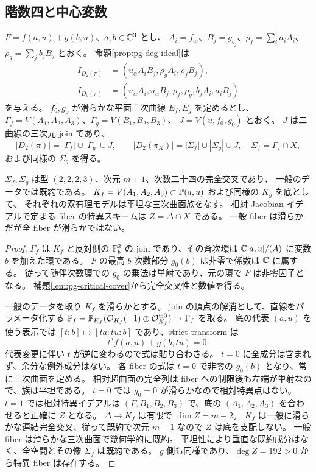 \subsection{階数四と中心変数}
$F=f(a,u)+g(b,u)$、$a,b\in\mathbb C^3$ とし、
$A_i=f_{a_i}$、$B_j=g_{b_j}$、$\rho_f=\sum_i a_iA_i$、$\rho_g=\sum_jb_jB_j$ とおく。
命題\ref{prop:pg-deg-ideal}は
\begin{equation}\begin{aligned}
I_{D_2(\pi)}&=(u_\alpha A_iB_j,\rho_gA_i,\rho_fB_j),\\
I_{D_0(\pi)}&=(u_\alpha A_i,u_\alpha B_j,\rho_f,\rho_g,b_jA_i,a_iB_j)
\end{aligned}\end{equation}
を与える。
$f_0,g_0$ が滑らかな平面三次曲線 $E_f,E_g$ を定めるとし、
$\Gamma_f=V(A_1,A_2,A_3)$、$\Gamma_g=V(B_1,B_2,B_3)$、
$J=V(u,f_0,g_0)$ とおく。
$J$ は二曲線の三次元 join であり、
\begin{equation}
|D_2(\pi)|=|\Gamma_f|\cup|\Gamma_g|\cup J,
\qquad |D_2(\pi_X)|=|\Sigma_f|\cup|\Sigma_g|\cup J,
\quad\Sigma_f=\Gamma_f\cap X,
\end{equation}
および同様の $\Sigma_g$ を得る。
\begin{proposition}\label{prop:pg-cubic-surface-family}
$\Sigma_f,\Sigma_g$ は型 $(2,2,2,3)$、次元 $m+1$、次数二十四の完全交叉であり、
一般のデータでは既約である。
$K_f=V(A_1,A_2,A_3)\subset\mathbb P(a,u)$ および同様の $K_g$ を底として、
それぞれの双有理モデルは平坦な三次曲面族をなす。
相対 Jacobian イデアルで定まる fiber の特異スキームは $Z=\Delta\cap X$ である。
一般 fiber は滑らかだが全 fiber が滑らかではない。
\end{proposition}
\begin{proof}
$\Gamma_f$ は $K_f$ と反対側の $\mathbb P_b^2$ の join であり、その斉次環は
$\mathbb C[a,u]/(A)$ に変数 $b$ を加えた環である。
$F$ の最高 $b$ 次数部分 $g_0(b)$ は非零で係数は $\mathbb C$ に属する。
従って随伴次数環での $g_0$ の乗法は単射であり、元の環で $F$ は非零因子となる。
補題\ref{lem:pg-critical-cover}から完全交叉性と数値を得る。

一般のデータを取り $K_f$ を滑らかとする。
join の頂点の解消として、直線をパラメータ化する
$\mathbb P_f=\mathbb P_{K_f}(\mathcal O_{K_f}(-1)\oplus\mathcal O_{K_f}^{\oplus3})\to\Gamma_f$ を取る。
底の代表 $(a,u)$ を使う表示では $[t:b]\mapsto[ta:tu:b]$ であり、strict transform は
\begin{equation}
t^3f(a,u)+g(b,tu)=0.\label{eq:pg-surface-fiber}
\end{equation}
代表変更に伴い $t$ が逆に変わるので式は貼り合わさる。
$t=0$ に全成分は含まれず、余分な例外成分はない。
各 fiber の式は $t=0$ で非零の $g_0(b)$ となり、常に三次曲面を定める。
相対超曲面の完全列は fiber への制限後も左端が単射なので、族は平坦である。
$t=0$ では $g_0=0$ が滑らかなので相対特異点はない。
$t=1$ では相対特異イデアルは $(F,B_1,B_2,B_3)$ で、底の $(A_1,A_2,A_3)$ を合わせると正確に $Z$ となる。
$\Delta\to K_f$ は有限で $\dim Z=m-2$。
$K_f$ は一般に滑らかな連結完全交叉、従って既約で次元 $m-1$ なので $Z$ は底を支配しない。
一般 fiber は滑らかな三次曲面で幾何学的に既約。
平坦性により垂直な既約成分はなく、全空間とその像 $\Sigma_f$ は既約である。
$g$ 側も同様であり、$\deg Z=192>0$ から特異 fiber は存在する。
\end{proof}
